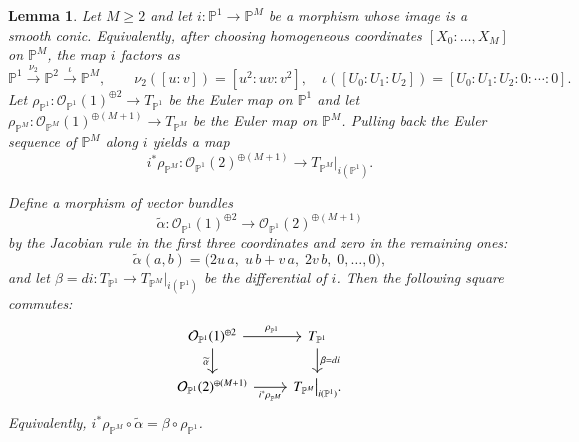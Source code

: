 \documentclass[11pt,twoside]{amsart}
\theoremstyle{plain}
\numberwithin{equation}{section}
\newtheorem{lemma}[theorem]{Lemma}
\theoremstyle{definition}
\newcommand{\PP}{\mathbb{P}}
\newcommand{\OO}{\mathcal{O}}
\begin{document}
\begin{lemma}\label{lem:veronese-right-square-PM}
Let $M\ge 2$ and let $i:\PP^1\to \PP^M$ be a morphism whose image is a smooth conic.
Equivalently, after choosing homogeneous coordinates $[X_0:\dots,X_M]$ on $\PP^M$,
the map $i$ factors as
\[
\PP^1 \xrightarrow{\ \nu_2\ } \PP^2 \xrightarrow{\ \iota\ } \PP^M,
\qquad
\nu_2([u:v])=[u^2:uv:v^2],\quad
\iota([U_0:U_1:U_2])=[U_0:U_1:U_2:0:\cdots:0].
\]
Let $\rho_{\PP^1}:\OO_{\PP^1}(1)^{\oplus 2}\to T_{\PP^1}$ be the Euler map on $\PP^1$ and
let $\rho_{\PP^M}:\OO_{\PP^M}(1)^{\oplus (M+1)}\to T_{\PP^M}$ be the Euler map on $\PP^M$.
Pulling back the Euler sequence of $\PP^M$ along $i$ yields a map
\[
i^*\rho_{\PP^M}:\OO_{\PP^1}(2)^{\oplus (M+1)}\longrightarrow T_{\PP^M}\big|_{i(\PP^1)}.
\]

Define a morphism of vector bundles
\[
\widetilde\alpha:\OO_{\PP^1}(1)^{\oplus 2}\longrightarrow \OO_{\PP^1}(2)^{\oplus (M+1)}
\]
by the Jacobian rule in the first three coordinates and zero in the remaining ones:
\[
\widetilde\alpha(a,b)=\bigl(2u\,a,\;u\,b+v\,a,\;2v\,b,\;0,\dots,0\bigr),
\]
and let $\beta=di:T_{\PP^1}\to T_{\PP^M}|_{i(\PP^1)}$ be the differential of $i$.
Then the following square commutes:
\[
\begin{tikzcd}
\OO_{\PP^1}(1)^{\oplus 2} \arrow[r, "\rho_{\PP^1}"] \arrow[d, "\widetilde\alpha"'] &
T_{\PP^1} \arrow[d, "\beta=di"] \\
\OO_{\PP^1}(2)^{\oplus (M+1)} \arrow[r, "i^*\rho_{\PP^M}"'] &
T_{\PP^M}\big|_{i(\PP^1)}.
\end{tikzcd}
\]
Equivalently, $i^*\rho_{\PP^M}\circ \widetilde\alpha=\beta\circ \rho_{\PP^1}$.
\end{lemma}
\end{document}
